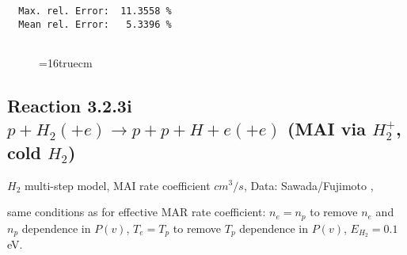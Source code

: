 \documentclass[12pt,dvipdfmx]{article}
\begin{document}
\begin{small}
\begin{verbatim}
  Max. rel. Error:  11.3558 %
  Mean rel. Error:   5.3396 %


\end{verbatim}\end{small}
\begin{figure} \label{2.2.5mad}
\epsfxsize=16truecm
\end{figure}
\newpage

\subsection{
Reaction 3.2.3i   $p + H_2 (+e)  \rightarrow p + p + H +e (+e) $ (MAI via $H_2^+$, cold $H_2$)
}

$H_2$ multi-step model, MAI rate coefficient $cm^3/s$,
 Data: Sawada/Fujimoto ,\cite{kn:Sawada}

same conditions as for effective MAR rate coefficient: $n_e=n_p$ to remove $n_e$ and $n_p$ dependence in $P(v)$,
$T_e=T_p$ to remove $T_p$ dependence in $P(v)$,  $E_{H_2}=0.1$ eV.
\end{document}
